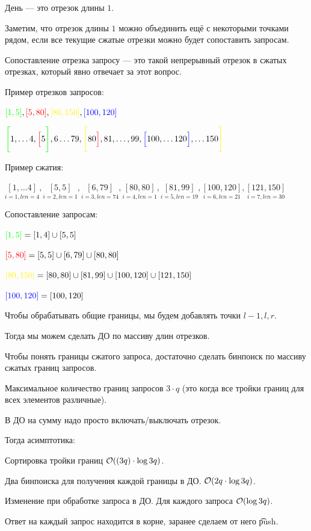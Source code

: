 День --- это отрезок длины $1$.

Заметим, что отрезок длины $1$ можно объединить ещё с некоторыми точками рядом, если все текущие сжатые отрезки можно будет сопоставить запросам.

Сопоставление отрезка запросу --- это такой непрерывный отрезок в сжатых отрезках, который явно отвечает за этот вопрос.
\down

Пример отрезков запросов:

$\green{[1, 5]}, \red{[5, 80]}, \yellow{[80, 150]}, \blue{[100, 120]}$

$\green{\Bigg[} 1, \ldots 4, \red{\Big[} 5 \green{\Bigg]}, 6 \ldots 79, \yellow{\Bigg[}80 \red{\Big]}, 81, \ldots, 99, \blue{\Big[}100, \ldots 120 \blue{\Big]}, \ldots 150 \yellow{\Bigg]}$
\down

Пример сжатия:

$\underset{i=1, len = 4}{[1, \ldots 4]}, \underset{i=2, len=1}{[5, 5]}, \underset{i=3, len=74}{[6, 79]}, \underset{i=4, len=1}{[80, 80]}, \underset{i=5, len=19}{[81, 99]}, \underset{i=6, len=21}{[100, 120]}, \underset{i=7, len=30}{[121, 150]}$
\down

Сопоставление запросам:

${\color{green}{[1, 5]}} = [1, 4] \cup [5, 5]$

${\color{red}{[5, 80]}} = [5, 5] \cup [6, 79] \cup [80, 80]$

$\yellow{[80, 150]} = [80, 80] \cup [81, 99] \cup [100, 120] \cup [121, 150]$

${\color{blue}{[100, 120]}} = [100, 120]$
\down


Чтобы обрабатывать общие границы, мы будем добавлять точки $l-1,l,r$.

Тогда мы можем сделать ДО по массиву длин отрезков.

Чтобы понять границы сжатого запроса, достаточно сделать бинпоиск по массиву сжатых границ запросов.

Максимальное количество границ запросов $3 \cdot q$ (это когда все тройки границ для всех элементов различные).

В ДО на сумму надо просто включать/выключать отрезок.

Тогда асимптотика:

\up \up
\begin{MyList}[0pt]
	\item Сортировка тройки границ $\mathcal{O}((3q) \cdot \log 3q)$.
	
	\item Два бинпоиска для получения каждой границы в ДО. $\mathcal{O}(2q \cdot \log 3q)$.
	
	\item Изменение при обработке запроса в ДО. Для каждого запроса $\mathcal{O}(\log 3q)$.
	
	\item Ответ на каждый запрос находится в корне, заранее сделаем от него \t{push}.
\end{MyList}

